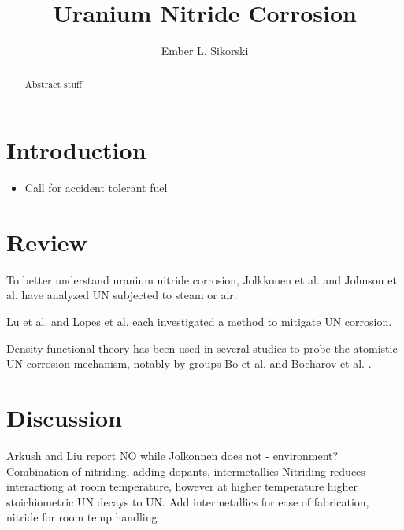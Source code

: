 \documentclass[3p,review,11pt]{elsarticle}
\begin{document}
\begin{frontmatter}
	\title{Uranium Nitride Corrosion}
	
	\author[boise]{Ember L. Sikorski}
	
	
	\address[boise]{Boise State University}
	
	\begin{abstract}
Abstract stuff
	\end{abstract}	
	
\end{frontmatter}


\section{Introduction}

\begin{itemize}
	\item Call for accident tolerant fuel
\end{itemize}

\section{Review}


To better understand uranium nitride corrosion, Jolkkonen et al. \cite{Jolkkonen2017} and Johnson et al. \cite{Johnson2016} have analyzed UN subjected to steam or air. 

Lu et al. \cite{Lu2016} and Lopes et al. \cite{Lopes2017} each investigated a method to mitigate UN corrosion. 

Density functional theory has been used in several studies to probe the atomistic UN corrosion mechanism, notably by groups Bo et al. \cite{Bo2016} and Bocharov et al. \cite{Bocharov2013}.



\section{Discussion}
Arkush and Liu report NO while Jolkonnen does not - environment?
Combination of nitriding, adding dopants, intermetallics
Nitriding reduces interactiong at room temperature, however at higher temperature higher stoichiometric UN decays to UN.
Add intermetallics for ease of fabrication, nitride for room temp handling
\par 
\end{document}
